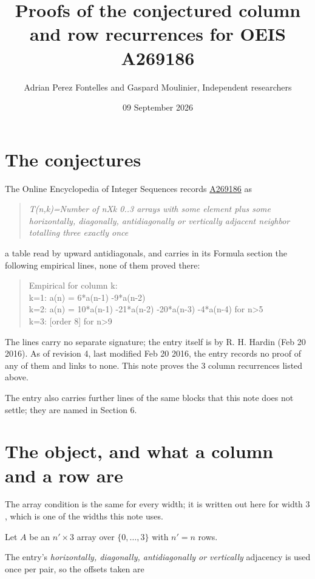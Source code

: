 \documentclass[11pt]{article}
\title{Proofs of the conjectured column and row recurrences for OEIS A269186}
\author{Adrian Perez Fontelles and Gaspard Moulinier, Independent researchers}
\date{09 September 2026}
\theoremstyle{definition}
\begin{document}
\maketitle
\section{The conjectures}

The Online Encyclopedia of Integer Sequences records \href{https://oeis.org/A269186}{A269186} as

\begin{quote}\itshape T(n,k)=Number of nXk 0..3 arrays with some element plus some horizontally, diagonally, antidiagonally or vertically adjacent neighbor totalling three exactly once\end{quote}

a table read by upward antidiagonals, and carries in its Formula section the following empirical lines, none of them proved there:

\begin{quote}\ttfamily Empirical for column k:\\
k=1: a(n) = 6*a(n-1) -9*a(n-2)\\k=2: a(n) = 10*a(n-1) -21*a(n-2) -20*a(n-3) -4*a(n-4) for n>5\\k=3: [order 8] for n>9\end{quote}

The lines carry no separate signature; the entry itself is by R. H. Hardin (Feb 20 2016). As of revision 4, last modified Feb 20 2016, the entry records no proof of any of them and links to none. This note proves the 3 column recurrences listed above.

The entry also carries further lines of the same blocks that this note does not settle; they are named in Section 6.

\section{The object, and what a column and a row are}

The array condition is the same for every width; it is written out here for width $3$, which is one of the widths this note uses.

Let $A$ be an $n' \times 3$ array over $\{0,\dots,3\}$ with $n' = n$ rows.

The entry's {\itshape horizontally, diagonally, antidiagonally or vertically} adjacency is used once per pair, so the offsets taken are
\end{document}
